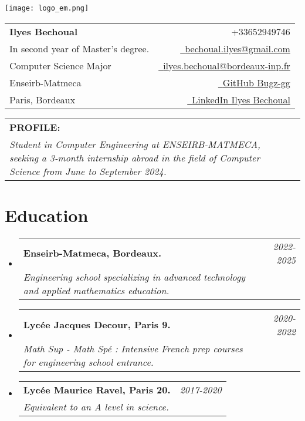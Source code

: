 \documentclass[a4paper,11pt]{article}
\makeatletter
\newcommand{\resumeSubheading}[4]{
\vspace{0.5mm}\item
    \begin{tabular*}{0.98\textwidth}[t]{l@{\extracolsep{\fill}}r}
        \textbf{#1} & \textit{\footnotesize{#4}} \\
        \textit{\footnotesize{#3}} &  \footnotesize{#2}\\
    \end{tabular*}
    \vspace{-2.4mm}
}
\newcommand{\profilesection}[2]{%
  \vspace{0.5mm}
  \begin{tabular*}{0.98\textwidth}[t]{l@{\extracolsep{\fill}}r}
    \textbf{#1} & \vspace{1mm} \\  
    \parbox{\linewidth}{\textit{\footnotesize #2}}
  \end{tabular*}
  \vspace{-2.4mm}
}
\newcommand{\resumeSubHeadingListStart}{\begin{itemize}[leftmargin=*,labelsep=0mm]}
\newcommand{\resumeSubHeadingListEnd}{\end{itemize}\vspace{2mm}}
\newcommand{\name}{Ilyes Bechoual} %
\newcommand{\course}{Computer Science Major} %
\newcommand{\phone}{652949746} %
\newcommand{\emaila}{bechoual.ilyes@gmail.com} %
\newcommand{\emailb}{ilyes.bechoual@bordeaux-inp.fr} %
\newcommand{\po}{\texttt{[image: logo\_em.jpg]}}
\newcommand{\pj}{\texttt{[image: jacdecour.jpg]}}
\newcommand{\pr}{\texttt{[image: Ravel.jpg]}}
\makeatother
\begin{document}
\selectfont 


\parbox{2.5cm}{%
\texttt{[image: logo\_em.png]}
}
\parbox{\dimexpr\linewidth-2.8cm\relax}{
\begin{tabularx}{\linewidth}{L r} \\
  \textbf{\Large \name} & {\raisebox{0.0\height}{\footnotesize \faPhone}\ +33\phone}\\
  {In second year of Master's degree.} & \href{mailto:\emaila}{\raisebox{0.0\height}{\footnotesize \faEnvelope}\ {\emaila}} \\
  \course &  \href{mailto:\emailb}{\raisebox{0.0\height}{\footnotesize \faEnvelope}\ {\emailb}}\\
  {Enseirb-Matmeca} &  \href{https://github.com/Bugz-gg}{\raisebox{0.0\height}{\footnotesize \faGithub}\ {GitHub Bugz-gg}} \\
  {Paris, Bordeaux} & \href{https://www.linkedin.com/in/ilyes-bechoual/}{\raisebox{0.0\height}{\footnotesize \faLinkedin}\ {LinkedIn Ilyes Bechoual}}
\end{tabularx}
}



\vspace{4mm}
\profilesection{PROFILE:}{Student in Computer Engineering at ENSEIRB-MATMECA, seeking a 3-month internship abroad in the field of Computer Science from June to September 2024.}

%

\section{\textbf{Education}}
  \resumeSubHeadingListStart
  \resumeSubheading
      { Enseirb-Matmeca, Bordeaux. \hspace{9.7cm}\raisebox{-0.3\height}{\po}}{}
      {Engineering school specializing in advanced technology and applied mathematics education.}{2022-2025}
    \resumeSubheading
      { Lycée Jacques Decour, Paris 9. \hspace{9.8cm}\raisebox{-0.3\height}{\pj}}{}
      {Math Sup - Math Spé : Intensive French prep courses for engineering school entrance.}{2020-2022}
    \resumeSubheading
      { Lycée Maurice Ravel, Paris 20. \hspace{9.6cm}\raisebox{-0.3\height}{\pr}}{}
      {Equivalent to an A level in science.}{2017-2020}
  \resumeSubHeadingListEnd
\vspace{-5.5mm}
%
\end{document}
